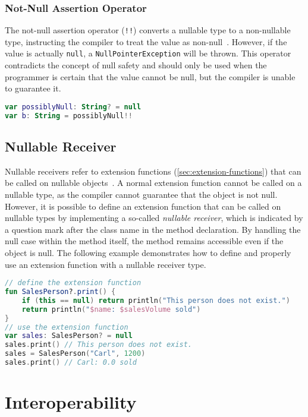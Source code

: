 \documentclass[a4paper,11pt]{article}
\begin{document}
\subsubsection{Not-Null Assertion Operator}
The not-null assertion operator (\texttt{!!}) converts a nullable type to a non-nullable type, instructing the compiler to treat the value as non-null~\cite{nullsafety-assertion}. However, if the value is actually \texttt{null}, a \texttt{NullPointerException} will be thrown.
This operator contradicts the concept of null safety and should only be used when the programmer is certain that the value cannot be null, but the compiler is unable to guarantee it.


\begin{lstlisting}[language=Kotlin, title={Usage of the not-null assertion}]
var possiblyNull: String? = null
var b: String = possiblyNull!!
\end{lstlisting}

\subsection{Nullable Receiver}
Nullable receivers refer to extension functions (\autoref{sec:extension-functions}) that can be called on nullable objects~\cite{nullsafety-nullable-receiver}. 
A normal extension function cannot be called on a nullable type, as the compiler cannot guarantee that the object is not null.
However, it is possible to define an extension function that can be called on nullable types by implementing a so-called \textit{nullable receiver}, which is indicated by a question mark after the class name in the method declaration. 
By handling the null case within the method itself, the method remains accessible even if the object is null.
The following example demonstrates how to define and properly use an extension function with a nullable receiver type.

\begin{lstlisting}[language=Kotlin,title={Usage of an extension function}]
// define the extension function
fun SalesPerson?.print() {
    if (this == null) return println("This person does not exist.")
    return println("$name: $salesVolume sold")
}
// use the extension function
var sales: SalesPerson? = null
sales.print() // This person does not exist.
sales = SalesPerson("Carl", 1200)
sales.print() // Carl: 0.0 sold
\end{lstlisting}

\section{Interoperability}
\end{document}
